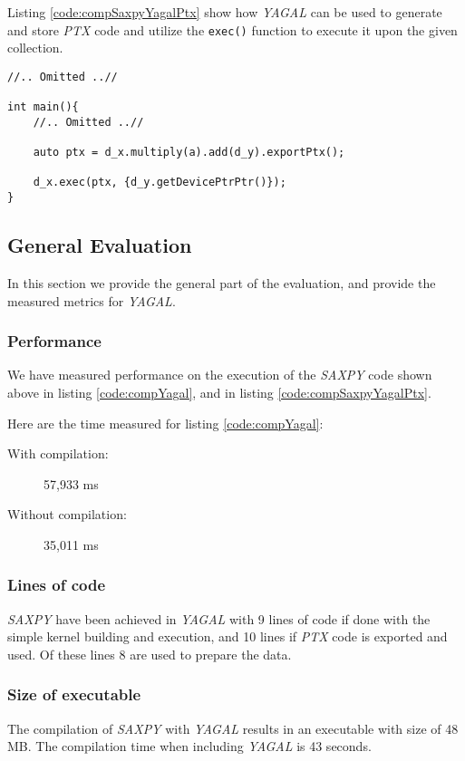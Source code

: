 Listing \ref{code:compSaxpyYagalPtx} show how \textit{YAGAL} can be used to generate and store \textit{PTX} code and utilize the \texttt{exec()} function to execute it upon the given collection.

\begin{lstlisting}[caption={\textit{YAGAL} \textit{SAXPY} utilizing \textit{PTX} generation.}, label={code:compSaxpyYagalPtx}]
//.. Omitted ..//

int main(){
    //.. Omitted ..//

    auto ptx = d_x.multiply(a).add(d_y).exportPtx();

    d_x.exec(ptx, {d_y.getDevicePtrPtr()});
}
\end{lstlisting}

\subsection{General Evaluation}
In this section we provide the general part of the evaluation, and provide the measured metrics for \textit{YAGAL}.

\subsubsection[*]{Performance}
We have measured performance on the execution of the \textit{SAXPY} code shown above in listing \ref{code:compYagal}, and in listing \ref{code:compSaxpyYagalPtx}.

Here are the time measured for listing \ref{code:compYagal}:
\begin{description}
    \item[With compilation:] 57,933 ms
    \item[Without compilation:] 35,011 ms
\end{description}

\subsubsection[*]{Lines of code}
\textit{SAXPY} have been achieved in \textit{YAGAL} with 9 lines of code if done with the simple kernel building and execution, and 10 lines if \textit{PTX} code is exported and used. Of these lines 8 are used to prepare the data.

\subsubsection[*]{Size of executable}
The compilation of \textit{SAXPY} with \textit{YAGAL} results in an executable with size of 48 MB. The compilation time when including \textit{YAGAL} is 43 seconds.

